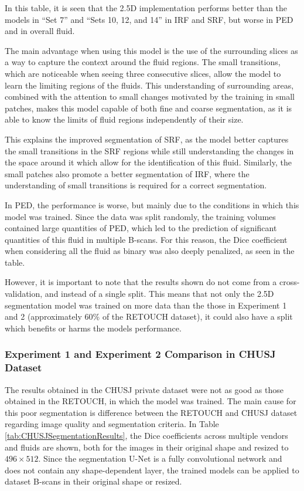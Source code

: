 In this table, it is seen that the 2.5D implementation performs better than the models in ``Set 7'' and ``Sets 10, 12, and 14'' in IRF and SRF, but worse in PED and in overall fluid.
\par
The main advantage when using this model is the use of the surrounding slices as a way to capture the context around the fluid regions. The small transitions, which are noticeable when seeing three consecutive slices, allow the model to learn the limiting regions of the fluids. This understanding of surrounding areas, combined with the attention to small changes motivated by the training in small patches, makes this model capable of both fine and coarse segmentation, as it is able to know the limits of fluid regions independently of their size. 
\par
This explains the improved segmentation of SRF, as the model better captures the small transitions in the SRF regions while still understanding the changes in the space around it which allow for the identification of this fluid. Similarly, the small patches also promote a better segmentation of IRF, where the understanding of small transitions is required for a correct segmentation.
\par
In PED, the performance is worse, but mainly due to the conditions in which this model was trained. Since the data was split randomly, the training volumes contained large quantities of PED, which led to the prediction of significant quantities of this fluid in multiple B-scans. For this reason, the Dice coefficient when considering all the fluid as binary was also deeply penalized, as seen in the table. 
\par
However, it is important to note that the results shown do not come from a cross-validation, and instead of a single split. This means that not only the 2.5D segmentation model was trained on more data than the those in Experiment 1 and 2 (approximately 60\% of the RETOUCH dataset), it could also have a split which benefits or harms the models performance.

\subsubsection{Experiment 1 and Experiment 2 Comparison in CHUSJ Dataset}

The results obtained in the CHUSJ private dataset were not as good as those obtained in the \hbox{RETOUCH}, in which the model was trained. The main cause for this poor segmentation is difference between the RETOUCH and CHUSJ dataset regarding image quality and segmentation criteria. In Table \ref{tab:CHUSJSegmentationResults}, the Dice coefficients across multiple vendors and fluids are shown, both for the images in their original shape and resized to $496 \times 512$. Since the segmentation U-Net is a fully convolutional network and does not contain any shape-dependent layer, the trained models can be applied to dataset B-scans in their original shape or resized.

